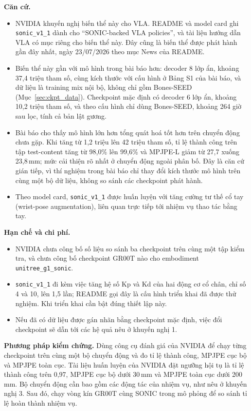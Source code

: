 \documentclass[12pt,a4paper,oneside]{report}
\newcommand{\code}[1]{\texttt{#1}}
\begin{document}
\textbf{Căn cứ.}
\begin{itemize}
\item NVIDIA khuyến nghị biến thể này cho VLA. README và model card ghi \code{sonic\_v1\_1} dành cho ``SONIC-backed VLA policies'', và tài liệu hướng dẫn VLA có mục riêng cho biến thể này. Đây cũng là biến thể được phát hành gần đây nhất, ngày 23/07/2026 theo mục News của README.
\item Biến thể này gần với mô hình trong bài báo hơn: decoder 8 lớp ẩn, khoảng 37,4 triệu tham số, cùng kích thước với cấu hình ở Bảng S1 của bài báo, và dữ liệu là training mix nội bộ, không chỉ gồm Bones-SEED (Mục~\ref{sec:ckpt_data}). Checkpoint mặc định có decoder 6 lớp ẩn, khoảng 10,2 triệu tham số, và theo cấu hình chỉ dùng Bones-SEED, khoảng 264 giờ sau lọc, tính cả bản lật gương.
\item Bài báo cho thấy mô hình lớn hơn tổng quát hoá tốt hơn trên chuyển động chưa gặp. Khi tăng từ 1,2 triệu lên 42 triệu tham số, tỉ lệ thành công trên tập test-content tăng từ 98,0\% lên 99,6\% và MPJPE-L giảm từ 27,7 xuống 23,8\,mm; mức cải thiện rõ nhất ở chuyển động ngoài phân bố. Đây là căn cứ gián tiếp, vì thí nghiệm trong bài báo chỉ thay đổi kích thước mô hình trên cùng một bộ dữ liệu, không so sánh các checkpoint phát hành.
\item Theo model card, \code{sonic\_v1\_1} được huấn luyện với tăng cường tư thế cổ tay (wrist-pose augmentation), liên quan trực tiếp tới nhiệm vụ thao tác bằng tay.
\end{itemize}

\textbf{Hạn chế và chi phí.}
\begin{itemize}
\item NVIDIA chưa công bố số liệu so sánh ba checkpoint trên cùng một tập kiểm tra, và chưa công bố checkpoint GR00T nào cho embodiment \code{unitree\_g1\_sonic}.
\item \code{sonic\_v1\_1} đi kèm việc tăng hệ số Kp và Kd của hai động cơ cổ chân, chỉ số 4 và 10, lên 1,5 lần; README gọi đây là cấu hình triển khai đã được thử nghiệm. Khi triển khai cần bật đúng thiết lập này.
\item Nếu đã có dữ liệu được gán nhãn bằng checkpoint mặc định, việc đổi checkpoint sẽ dẫn tới các hệ quả nêu ở khuyến nghị 1.
\end{itemize}

\textbf{Phương pháp kiểm chứng.} Dùng công cụ đánh giá của NVIDIA để chạy từng checkpoint trên cùng một bộ chuyển động và đo tỉ lệ thành công, MPJPE cục bộ và MPJPE toàn cục. Tài liệu huấn luyện của NVIDIA đặt ngưỡng hội tụ là tỉ lệ thành công trên 0,97, MPJPE cục bộ dưới 30\,mm và MPJPE toàn cục dưới 200\,mm. Bộ chuyển động cần bao gồm các động tác của nhiệm vụ, như nêu ở khuyến nghị 3. Sau đó, chạy vòng kín GR00T cùng SONIC trong mô phỏng để so sánh tỉ lệ hoàn thành nhiệm vụ.
\end{document}
